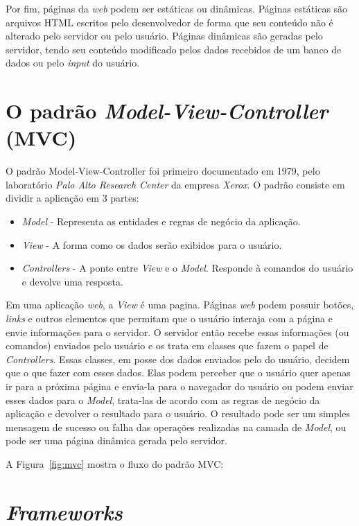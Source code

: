 Por fim, páginas da \textit{web} podem ser estáticas ou dinâmicas. 
Páginas estáticas são arquivos HTML escritos pelo desenvolvedor  de forma que seu conteúdo não é alterado pelo servidor ou pelo usuário.
Páginas dinâmicas são geradas pelo servidor, tendo seu conteúdo modificado pelos dados recebidos de um banco de dados ou pelo \textit{input} do usuário.

\section{O padrão \textit{Model-View-Controller} (MVC)}

O padrão Model-View-Controller foi primeiro documentado em 1979, pelo laboratório \textit{Palo Alto Research Center} da empresa \textit{Xerox}.
O padrão consiste em dividir a aplicação em 3 partes:

\begin{itemize}
  \item \textit{Model} - Representa as entidades e regras de negócio da aplicação.
  \item \textit{View} - A forma como os dados serão exibidos para o usuário.
  \item \textit{Controllers} - A ponte entre \textit{View} e o \textit{Model}. Responde à comandos do usuário e devolve uma resposta.
\end{itemize}

Em uma aplicação \textit{web}, a \textit{View} é uma pagina. 
Páginas \textit{web} podem possuir botões, \textit{links} e outros elementos que permitam que o usuário interaja com a página e envie informações para o servidor.
O servidor então recebe essas informações (ou comandos) enviados pelo usuário e os trata em classes que fazem o papel de \textit{Controllers}.
Essas classes, em posse dos dados enviados pelo do usuário, decidem que o que fazer com esses dados. 
Elas podem perceber que o usuário quer apenas ir para a próxima página e envia-la para o navegador do usuário ou podem enviar esses dados para o \textit{Model}, trata-las de acordo com as regras de negócio da aplicação e devolver o resultado para o usuário.
O resultado pode ser um simples mensagem de sucesso ou falha das operações realizadas na camada de \textit{Model}, ou pode ser uma página dinâmica gerada pelo servidor.

A Figura~\ref{fig:mvc} mostra o fluxo do padrão MVC:


\section{\textit{Frameworks}}

